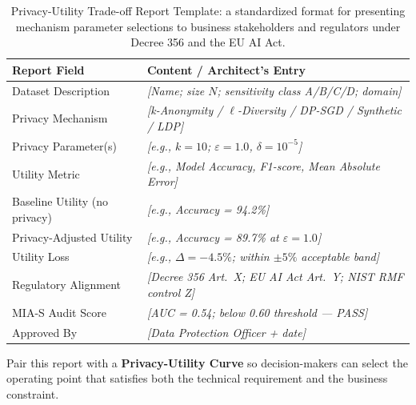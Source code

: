 \begin{table}[ht]
\centering
\caption{Privacy-Utility Trade-off Report Template: a standardized format for presenting mechanism parameter selections to business stakeholders and regulators under Decree 356 and the EU AI Act.}
\label{tab:pareto_report}
\renewcommand{\arraystretch}{1.4}
\begin{tabular}{p{3.8cm} p{7.5cm}}
\toprule
\textbf{Report Field} & \textbf{Content / Architect's Entry} \\
\midrule
Dataset Description & \textit{[Name; size $N$; sensitivity class A/B/C/D; domain]} \\
Privacy Mechanism & \textit{[k-Anonymity / $\ell$-Diversity / DP-SGD / Synthetic / LDP]} \\
Privacy Parameter(s) & \textit{[e.g., $k=10$; $\varepsilon=1.0$, $\delta=10^{-5}$]} \\
Utility Metric & \textit{[e.g., Model Accuracy, F1-score, Mean Absolute Error]} \\
Baseline Utility (no privacy) & \textit{[e.g., Accuracy = 94.2\%]} \\
Privacy-Adjusted Utility & \textit{[e.g., Accuracy = 89.7\% at $\varepsilon=1.0$]} \\
Utility Loss & \textit{[e.g., $\Delta = -4.5\%$; within $\pm5\%$ acceptable band]} \\
Regulatory Alignment & \textit{[Decree 356 Art.\ X; EU AI Act Art.\ Y; NIST RMF control Z]} \\
MIA-S Audit Score & \textit{[AUC = 0.54; below 0.60 threshold --- PASS]} \\
Approved By & \textit{[Data Protection Officer + date]} \\
\bottomrule
\end{tabular}
\end{table}

Pair this report with a \textbf{Privacy-Utility Curve} so decision-makers can select the operating point that satisfies both the technical requirement and the business constraint.

